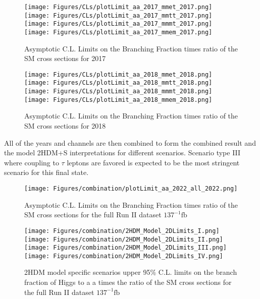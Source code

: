 \begin{figure}[ht!b]
  \centering
  \texttt{[image: Figures/CLs/plotLimit\_aa\_2017\_mmet\_2017.png]}
  \texttt{[image: Figures/CLs/plotLimit\_aa\_2017\_mmtt\_2017.png]}\\
  \texttt{[image: Figures/CLs/plotLimit\_aa\_2017\_mmmt\_2017.png]}
  \texttt{[image: Figures/CLs/plotLimit\_aa\_2017\_mmem\_2017.png]}\\
    \caption{\label{fig:CLs2017} Asymptotic C.L. Limits on the Branching Fraction times ratio of the SM cross sections for 2017}
\end{figure}

\begin{figure}[ht!b]
  \centering
  \texttt{[image: Figures/CLs/plotLimit\_aa\_2018\_mmet\_2018.png]}
  \texttt{[image: Figures/CLs/plotLimit\_aa\_2018\_mmtt\_2018.png]}\\
  \texttt{[image: Figures/CLs/plotLimit\_aa\_2018\_mmmt\_2018.png]}
  \texttt{[image: Figures/CLs/plotLimit\_aa\_2018\_mmem\_2018.png]}\\
    \caption{\label{fig:CLs2018} Asymptotic C.L. Limits on the Branching Fraction times ratio of the SM cross sections for 2018}
\end{figure}

All of the years and channels are then combined to form the combined result and the model 2HDM+S interpretations for different scenarios. Scenario type III where coupling to $\tau$ leptons are favored is expected to be the most stringent scenario for this final state. 

\begin{figure}[ht!b]
  \texttt{[image: Figures/combination/plotLimit\_aa\_2022\_all\_2022.png]}
    \caption{\label{fig:CLsRunII} Asymptotic C.L. Limits on the Branching Fraction times ratio of the SM cross sections for the full Run II dataset $\text{137}^{-1} \text{fb}$}
\end{figure}

\begin{figure}[ht!b]
  \centering
  \texttt{[image: Figures/combination/2HDM\_Model\_2DLimits\_I.png]}
  \texttt{[image: Figures/combination/2HDM\_Model\_2DLimits\_II.png]}\\
  \texttt{[image: Figures/combination/2HDM\_Model\_2DLimits\_III.png]}
  \texttt{[image: Figures/combination/2HDM\_Model\_2DLimits\_IV.png]}\\
    \caption{\label{fig:2HDM} 2HDM model specific scenarios upper 95\% C.L. limits on the branch fraction of Higgs to a a times the ratio of the SM cross sections for the full Run II dataset $\text{137}^{-1} \text{fb}$ }
\end{figure}

